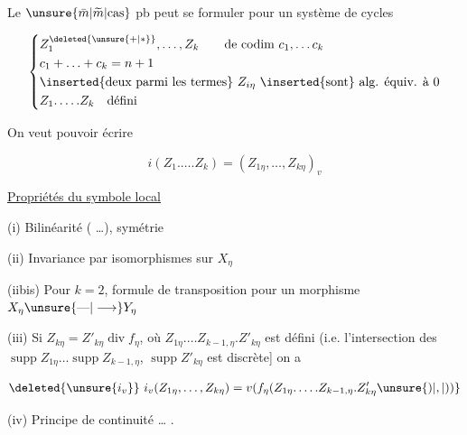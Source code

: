 Le $\unsure{\bar m|\widetilde m|\text{cas}}$ pb peut se formuler pour un
système de cycles

\[
\left\{\begin{aligned}
&Z_1^{\deleted{\unsure{+|*}}},\ldots,Z_k\qquad\text{de codim }c_1,\ldots c_k\\
&c_1+\ldots+c_k=n+1\\
&\text{\inserted{deux parmi les termes}}\ Z_{i\eta}\ \text{\inserted{sont} alg. équiv. à }0\\
&Z_1.\ldots.Z_k\quad\text{défini}
\end{aligned}\right.
\]

On veut pouvoir écrire

\[
 i(Z_1.\ldots.Z_k)=(Z_{1\eta},\ldots,Z_{k\eta})_v
\]

\uline{Propriétés du symbole local}

(i) Bilinéarité ( \ldots), symétrie

(ii) Invariance par isomorphismes sur $X_\eta$

(iibis) Pour $k=2$, formule de transposition
pour un morphisme $X_\eta\unsure{\text{---}|\longrightarrow}Y_\eta$

(iii)   Si $Z_{k\eta}=Z'_{k\eta}\operatorname{div}f_\eta$,
 où $Z_{1\eta}.\ldots Z_{k-1,\eta}.Z'_{k\eta}$ est défini (i.e.
l’intersection des $\operatorname{supp}Z_{1\eta}\ldots\operatorname{supp}Z_{k-1,\eta}$, $\operatorname{supp}Z'_{k\eta}$
est discrète] on a

\[
 \deleted{\unsure{i_v}}\ i_v(Z_{1\eta},\ldots,Z_{k\eta})=v(f_\eta(Z_{1\eta}.\ldots.Z_{k-1,\eta}.Z'_{k\eta} \unsure{)|,|))}
\]

(iv) Principe de continuité \ldots{} .

